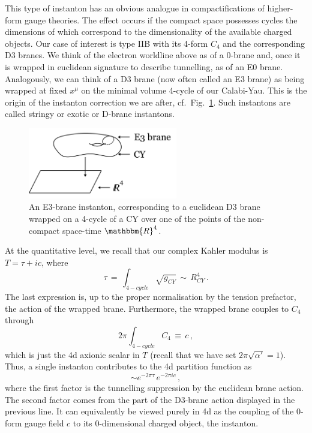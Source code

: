\documentclass[12pt]{article}
\newcommand{\be}{\begin{equation}}
\newcommand{\ee}{\end{equation}}
\numberwithin{equation}{section}
\begin{document}
This type of instanton has an obvious analogue in compactifications of higher-form gauge theories. The effect occurs if the compact space possesses cycles the dimensions of which correspond to the dimensionality of the available charged objects. Our case of interest is type IIB with its 4-form $C_4$ and the corresponding D3 branes. We think of the electron worldline above as of a 0-brane and, once it is wrapped in euclidean signature to describe tunnelling, as of an E0 brane. Analogously, we can think of a D3 brane (now often called an E3 brane) as being wrapped at fixed $x^\mu$ on the minimal volume 4-cycle of our Calabi-Yau. This is the origin of the instanton correction we are after, cf.~Fig.~\ref{e3}. Such instantons are called stringy or exotic or D-brane instantons.

\begin{figure}[ht]
\begin{center} 
\includegraphics[width=6.5cm]{e3.png}
\caption{An E3-brane instanton, corresponding to a euclidean D3 brane wrapped on a 4-cycle of a CY over one of the points of the non-compact space-time $\mathbbm{R}^4$.}
\label{e3} 
\end{center}
\end{figure}

At the quantitative level, we recall that our complex Kahler modulus is $T=\tau+ic$, where
\be
\tau \,=\, \int_{4-cycle}\sqrt{g_{CY}} \,\sim\, R_{CY}^4\,.
\ee
The last expression is, up to the proper normalisation by the tension prefactor, the action of the wrapped brane. Furthermore, the wrapped brane couples to $C_4$ through
\be
2\pi \int_{4-cycle} C_4\,\equiv\, c\,,
\ee
which is just the 4d axionic scalar in $T$ (recall that we have set $2\pi\sqrt{\alpha'}=1$). Thus, a single instanton contributes to the 4d partition function as
\be
\sim e^{-2\pi\tau}\,e^{-2\pi i c}\,,
\ee
where the first factor is the tunnelling suppression by the euclidean brane action. The second factor comes from the part of the D3-brane action displayed in the previous line. It can equivalently be viewed purely in 4d as the coupling of the 0-form gauge field $c$ to its 0-dimensional charged object, the instanton.
\end{document}
